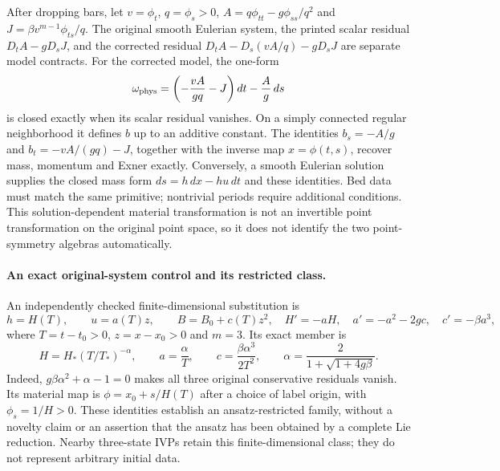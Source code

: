 \documentclass[11pt]{article}
\theoremstyle{definition}
\begin{document}
After dropping bars, let $v=\phi_t$, $q=\phi_s>0$,
$A=q\phi_{tt}-g\phi_{ss}/q^2$ and
$J=\beta v^{m-1}\phi_{ts}/q$. The original smooth Eulerian system,
the printed scalar residual $D_tA-gD_sJ$, and the corrected residual
$D_tA-D_s(vA/q)-gD_sJ$ are separate model contracts. For the corrected
model, the one-form
\begin{equation}\label{eq:autonomous-bed-form}
 \omega_{\rm phys}=\left(-\frac{vA}{gq}-J\right)dt
                         -\frac{A}{g}\,ds
\end{equation}
is closed exactly when its scalar residual vanishes. On a simply connected
regular neighborhood it defines $b$ up to an additive constant. The
identities $b_s=-A/g$ and $b_t=-vA/(gq)-J$, together with the inverse map
$x=\phi(t,s)$, recover mass, momentum and Exner exactly. Conversely, a
smooth Eulerian solution supplies the closed mass form
$ds=h\,dx-hu\,dt$ and these identities. Bed data must match the same
primitive; nontrivial periods require additional conditions. This
solution-dependent material transformation is not an invertible point
transformation on the original point space, so it does not identify the
two point-symmetry algebras automatically.

\paragraph{An exact original-system control and its restricted class.}
An independently checked finite-dimensional substitution is
\begin{equation}\label{eq:autonomous-affine-ode}
 h=H(T),\qquad u=a(T)z,\qquad B=B_0+c(T)z^2,
 \quad
 H'=-aH,\quad a'=-a^2-2gc,\quad c'=-\beta a^3,
\end{equation}
where $T=t-t_0>0$, $z=x-x_0>0$ and $m=3$.
Its exact member is
\begin{equation}\label{eq:autonomous-affine}
 H=H_*\left(T/T_*\right)^{-\alpha},\qquad
 a=\frac{\alpha}{T},\qquad c=\frac{\beta\alpha^3}{2T^2},
 \qquad \alpha=\frac{2}{1+\sqrt{1+4g\beta}}.
\end{equation}
Indeed, $g\beta\alpha^2+\alpha-1=0$ makes all three original
conservative residuals vanish. Its material map is
$\phi=x_0+s/H(T)$ after a choice of label origin, with
$\phi_s=1/H>0$. These identities establish an ansatz-restricted family,
without a novelty claim or an assertion that the ansatz has been obtained
by a complete Lie reduction. Nearby three-state IVPs retain this
finite-dimensional class; they do not represent arbitrary initial data.
\end{document}
